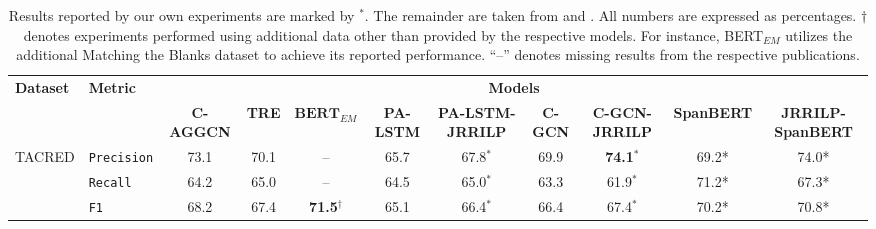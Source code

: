 \begin{table*}[!t]
\centering
\begin{adjustbox}{width=\textwidth}
\begin{tabular}{llccccccccc}
\toprule
\multirow{2}{*}{\textbf{Dataset}} & \multirow{2}{*}{\textbf{Metric}} & \multicolumn{9}{c}{\textbf{Models}} \\
\cmidrule{3-11}
& & \textbf{C-AGGCN} & \textbf{TRE} & $\textbf{BERT}_{EM}$ & \textbf{PA-LSTM} & \textbf{PA-LSTM-JRRILP} &  \textbf{C-GCN}  &\textbf{C-GCN-JRRILP} & \textbf{SpanBERT} & \textbf{JRRILP-SpanBERT}\\
\midrule                
\multirow{3}{*}{TACRED}
  & \texttt{Precision}   & 73.1 & 70.1 & --                      & 65.7  &  67.8$^*$ & 69.9    & \textbf{74.1}$^*$  & 69.2* & 74.0* \\
  & \texttt{Recall}  & 64.2 & 65.0     & --                      & 64.5  &  65.0$^*$ & 63.3    &  61.9$^*$          & 71.2* & 67.3* \\
  & \texttt{F1}      & 68.2 & 67.4     & \textbf{71.5}$^\dagger$ & 65.1  &  66.4$^*$ & 66.4    &  67.4$^*$          & 70.2* & 70.8* \\
\bottomrule
\end{tabular}
\end{adjustbox}
\caption{Results reported by our own experiments are marked by $^*$. The remainder are taken from \citep{tre} and \citep{knowbert}.
All numbers are expressed as percentages.
$\dagger$ denotes experiments performed using additional data other than provided by the respective models. For instance, BERT$_{EM}$ utilizes the additional Matching the Blanks dataset \cite{bert-em} to achieve its reported performance. ``--'' denotes missing results from the respective publications. \\}
\label{tab:results}
\end{table*}
